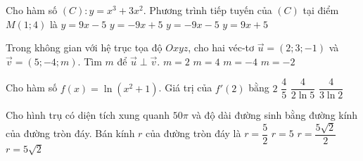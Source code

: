 \begin{ex}%
	Cho hàm số $ (C)\colon y=x^3+3x^2 $. Phương trình tiếp tuyến của $ (C) $ tại điểm $ M(1;4) $ là  
	\choice
	{\True $ y=9x-5 $}
	{$ y=-9x+5 $}
	{$ y=-9x-5 $}
	{$ y=9x+5 $}
\end{ex}



\begin{ex}%
	Trong không gian với hệ trục tọa độ $ Oxyz $, cho hai véc-tơ $ \overrightarrow{u}=(2;3;-1) $ và $ \overrightarrow{v}=(5;-4;m) $. Tìm $ m $ để $ \overrightarrow{u}\perp \overrightarrow{v} $.
	\choice
	{$ m=2 $}
	{$ m=4 $}
	{$ m=-4 $}
	{\True $ m=-2 $}
\end{ex}

\begin{ex}%
	Cho hàm số $ f(x)=\ln (x^2+1) $. Giá trị của $ f'(2) $ bằng
	\choice
	{$ 2 $}
	{\True $ \dfrac{4}{5} $}
	{$ \dfrac{4}{2\ln 5} $}
	{$ \dfrac{4}{3\ln 2} $}
\end{ex}

\begin{ex}%
	Cho hình trụ có diện tích xung quanh $ 50\pi $ và độ dài đường sinh bằng đường kính của đường tròn đáy. Bán kính $ r $ của đường tròn đáy là
	\choice
	{$ r=\dfrac{5}{2} $}
	{$ r=5 $}
	{\True $ r=\dfrac{5\sqrt{2}}{2} $}
	{$ r=5\sqrt{2} $}
\end{ex}


